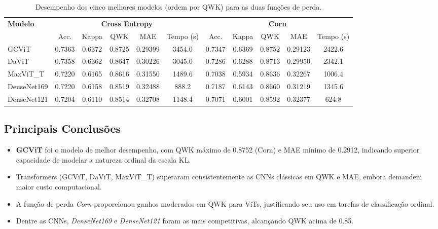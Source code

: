 \begin{table}[htb]
\centering
\caption{Desempenho dos cinco melhores modelos (ordem por QWK) para as duas funções de perda.}
\label{tab:resultados}
\begin{tabular}{l|ccccc|ccccc}
\hline
\multirow{2}{*}{\textbf{Modelo}} & \multicolumn{5}{c|}{\textbf{Cross Entropy}} & \multicolumn{5}{c}{\textbf{Corn}} \\
 & Acc. & Kappa & QWK & MAE & Tempo (s) & Acc. & Kappa & QWK & MAE & Tempo (s) \\
\hline
GCViT        & 0.7363 & 0.6372 & 0.8725 & 0.29399 & 3454.0 & 0.7347 & 0.6369 & 0.8752 & 0.29123 & 2422.6 \\
DaViT        & 0.7358 & 0.6362 & 0.8647 & 0.30226 & 3045.0 & 0.7286 & 0.6288 & 0.8713 & 0.29950 & 2342.1 \\
MaxViT\_T    & 0.7220 & 0.6165 & 0.8616 & 0.31550 & 1489.6 & 0.7038 & 0.5934 & 0.8636 & 0.32267 & 1006.4 \\
DenseNet169  & 0.7220 & 0.6158 & 0.8519 & 0.32488 &  888.2 & 0.7187 & 0.6143 & 0.8660 & 0.31219 & 1345.6 \\
DenseNet121  & 0.7204 & 0.6110 & 0.8514 & 0.32708 & 1148.4 & 0.7071 & 0.6001 & 0.8592 & 0.32377 &  624.8 \\
\hline
\end{tabular}
\end{table}

\subsection{Principais Conclusões}

\begin{itemize}
  \item \textbf{GCViT} foi o modelo de melhor desempenho, com QWK máximo de 0.8752 (Corn) e MAE mínimo de 0.2912, indicando superior capacidade de modelar a natureza ordinal da escala KL.
  \item Transformers (GCViT, DaViT, MaxViT\_T) superaram consistentemente as CNNs clássicas em QWK e MAE, embora demandem maior custo computacional.
  \item A função de perda \emph{Corn} proporcionou ganhos moderados em QWK para ViTs, justificando seu uso em tarefas de classificação ordinal.
  \item Dentre as CNNs, \emph{DenseNet169} e \emph{DenseNet121} foram as mais competitivas, alcançando QWK acima de 0.85.
\end{itemize}
